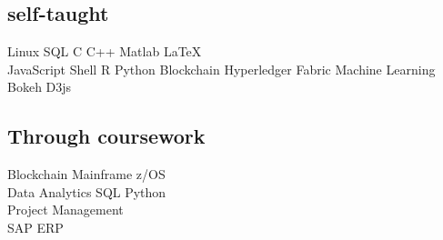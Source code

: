 \documentclass[]{deedy-resume-openfont}
\def\tb{\textbullet}
\begin{document}
\begin{minipage}[t]{0.33\textwidth}
\subsection{self-taught}
 Linux \tb{} SQL \tb{}
C \tb{} C++ \tb{} Matlab \tb{} \LaTeX\ \\
  JavaScript \tb{} Shell \tb{} R \tb{} Python \tb{}
Blockchain \tb{} Hyperledger Fabric \tb{} Machine Learning \tb{} Bokeh \tb{}
 D3js \\ 
\sectionsep

\subsection{Through coursework}
Blockchain \tb{} Mainframe \tb{} z/OS \\
Data Analytics \tb{} SQL \tb{} Python \\
Project Management \\
SAP ERP

%
%

\end{minipage} 
\hfill
\end{document}
